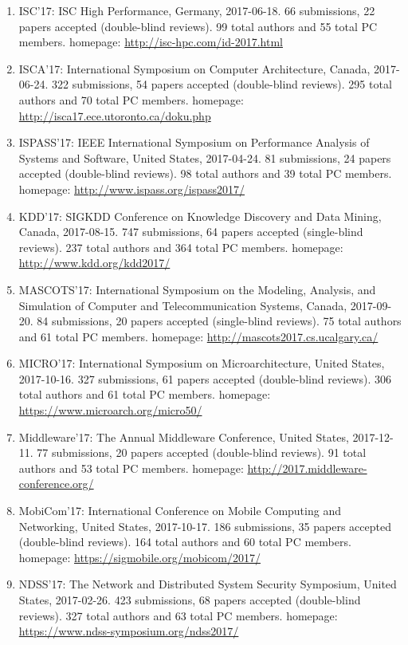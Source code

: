 \documentclass[10pt,letterpaper]{article}
\begin{document}
\begin{enumerate}
\item ISC'17: ISC High Performance, Germany, 2017-06-18. 66  submissions, 22 papers accepted (double-blind reviews). 99 total authors and 55 total PC members. homepage: \url{http://isc-hpc.com/id-2017.html}
\item ISCA'17: International Symposium on Computer Architecture, Canada, 2017-06-24. 322  submissions, 54 papers accepted (double-blind reviews). 295 total authors and 70 total PC members. homepage: \url{http://isca17.ece.utoronto.ca/doku.php}
\item ISPASS'17: IEEE International Symposium on Performance Analysis of Systems and Software, United States, 2017-04-24. 81  submissions, 24 papers accepted (double-blind reviews). 98 total authors and 39 total PC members. homepage: \url{http://www.ispass.org/ispass2017/}
\item KDD'17: SIGKDD Conference on Knowledge Discovery and Data Mining, Canada, 2017-08-15. 747  submissions, 64 papers accepted (single-blind reviews). 237 total authors and 364 total PC members. homepage: \url{http://www.kdd.org/kdd2017/}
\item MASCOTS'17: International Symposium on the Modeling, Analysis, and Simulation of Computer and Telecommunication Systems, Canada, 2017-09-20. 84  submissions, 20 papers accepted (single-blind reviews). 75 total authors and 61 total PC members. homepage: \url{http://mascots2017.cs.ucalgary.ca/}
\item MICRO'17: International Symposium on Microarchitecture, United States, 2017-10-16. 327  submissions, 61 papers accepted (double-blind reviews). 306 total authors and 61 total PC members. homepage: \url{https://www.microarch.org/micro50/}
\item Middleware'17: The Annual Middleware Conference, United States, 2017-12-11. 77  submissions, 20 papers accepted (double-blind reviews). 91 total authors and 53 total PC members. homepage: \url{http://2017.middleware-conference.org/}
\item MobiCom'17: International Conference on Mobile Computing and Networking, United States, 2017-10-17. 186  submissions, 35 papers accepted (double-blind reviews). 164 total authors and 60 total PC members. homepage: \url{https://sigmobile.org/mobicom/2017/}
\item NDSS'17: The Network and Distributed System Security Symposium, United States, 2017-02-26. 423  submissions, 68 papers accepted (double-blind reviews). 327 total authors and 63 total PC members. homepage: \url{https://www.ndss-symposium.org/ndss2017/}

\end{enumerate}
\end{document}
